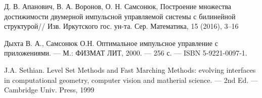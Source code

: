 \begin{thebibliography}{99}
 {Д. В. Апанович, В. А. Воронов, О. Н. Самсонюк},
  Построение множества достижимости двумерной импульсной управляемой
  системы с билинейной структурой// Изв. Иркутского
  гос. ун-та. Сер. Математика, 15 (2016), 3–16

 {Дыхта В. А., Самсонюк О.Н.} Оптимальное импульсное
  управление с приложениями. — М.: ФИЗМАТ ЛИТ, 2000. — 256 с. — ISBN
  5-9221-0097-1.

 {J.A. Sethian.} Level Set Methods and Fast Marching Methods: evolving
interfaces in computational geometry, computer vision and matherial
science. — 2nd Ed. — Cambridge Univ. Press, 1999

\end{thebibliography}


